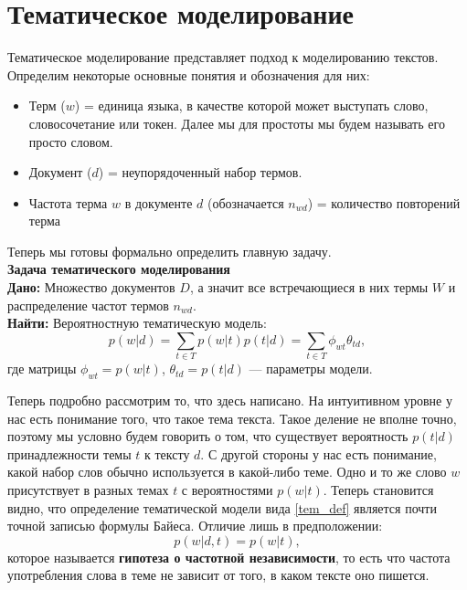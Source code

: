\section{Тематическое моделирование}
Тематическое моделирование представляет подход к моделированию текстов. Определим некоторые основные понятия и обозначения для них:
\begin{itemize}
    \item Терм ($w$) = единица языка, в качестве которой может выступать слово, словосочетание или токен. Далее мы для простоты мы будем называть его просто словом.
    \item Документ ($d$) = неупорядоченный набор термов. 
    \item Частота терма $w$ в документе $d$ (обозначается $n_{wd}$) = количество повторений терма
\end{itemize}
Теперь мы готовы формально определить главную задачу.\\
\textbf{Задача тематического моделирования}\\
\textbf{Дано:} Множество документов $D$, а значит все встречающиеся в них термы $W$ и распределение частот термов $n_{wd}$.\\
\textbf{Найти:} Вероятностную тематическую модель:
\begin{equation}\label{tem_def}
    p(w|d) = \sum\limits_{t\in T} p(w|t) p(t|d) = \sum\limits_{t\in T} \phi_{wt} \theta_{td}, 
\end{equation}
где матрицы $\phi_{wt} = p(w|t)$,  $\theta_{td} = p(t|d)$ --- параметры модели.

Теперь подробно рассмотрим то, что здесь написано. На интуитивном уровне у нас есть понимание того, что такое тема текста. Такое деление не вполне точно, поэтому мы условно будем говорить о том, что существует вероятность $p(t|d)$ принадлежности темы $t$ к тексту $d$. С другой стороны у нас есть понимание, какой набор слов обычно используется в какой-либо теме. Одно и то же слово $w$ присутствует в разных темах $t$ с вероятностями $p(w|t)$. Теперь становится видно, что определение тематической модели вида \eqref{tem_def} является почти точной записью формулы Байеса. Отличие лишь в предположении: 
\begin{equation}
    p(w|d,t) = p(w|t), 
\end{equation}
которое называется \textbf{гипотеза о частотной независимости}, то есть что частота употребления слова в теме не зависит от того, в каком тексте оно пишется.

